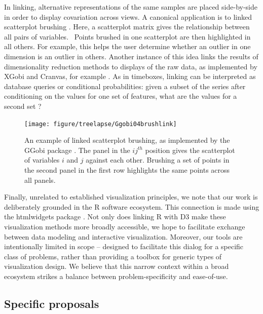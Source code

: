 In linking, alternative representations of the same samples are placed
side-by-side in order to display covariation across views. A canonical
application is to linked scatterplot brushing \citep{becker1987brushing}. Here,
a scatterplot matrix gives the relationship between all pairs of variables.
~Points brushed in one scatterplot are then highlighted in all others. For
example, this helps the user determine whether an outlier in one dimension is an
outlier in others. Another instance of this idea links the results of
dimensionality reduction methods to displays of the raw data, as implemented by
XGobi and Cranvas, for example \citep{xie2013cranvas, swayne1998xgobi}. As in
timeboxes, linking can be interpreted as database queries or conditional
probabilities: given a subset of the series after conditioning on the values for
one set of features, what are the values for a second set
\citep{buja1996interactive}?

\begin{figure}
  \centering
  \texttt{[image: figure/treelapse/Ggobi04brushlink]}
  \caption{
    An example of linked scatterplot brushing, as implemented by the GGobi
    package \citep{voigt2002extended}. The panel in the $ij^{th}$ position gives
    the scatterplot of variables $i$ and $j$ against each other. Brushing a
    set of points in the second panel in the first row highlights the same
    points across all panels.
    \label{fig:ggobi_brushlink} }
\end{figure}

Finally, unrelated to established visualization principles, we note that our
work is deliberately grounded in the R software ecosystem. This connection is
made using the htmlwidgets package \citep{vaidyanathan2014htmlwidgets}. Not only
does linking R with D3 make these visualization methods more broadly accessible,
we hope to facilitate exchange between data modeling and interactive
visualization. Moreover, our tools are intentionally limited in scope --
designed to facilitate this dialog for a specific class of problems, rather than
providing a toolbox for generic types of visualization design. We believe that
this narrow context within a broad ecosystem strikes a balance between
problem-specificity and ease-of-use.

\subsection{Specific proposals}\label{specific-proposals}

